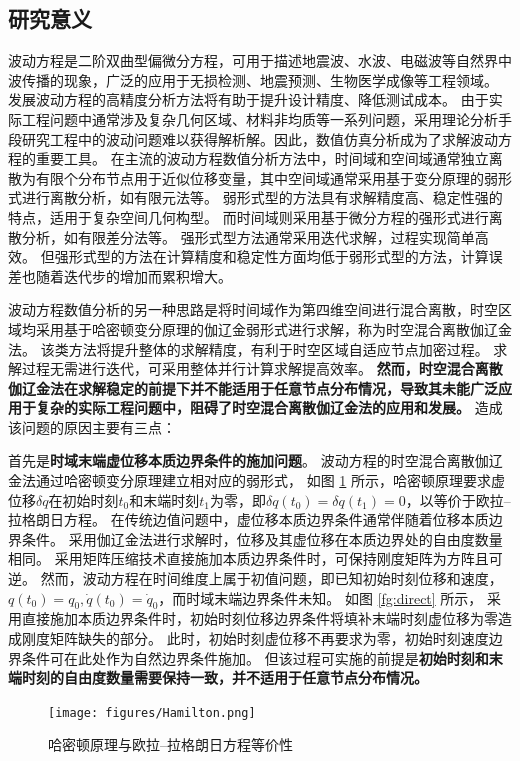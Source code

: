 
\subsection{研究意义}
波动方程是二阶双曲型偏微分方程\cite{bedford1994}，可用于描述地震波、水波、电磁波等自然界中波传播的现象，广泛的应用于无损检测、地震预测、生物医学成像等工程领域。
发展波动方程的高精度分析方法将有助于提升设计精度、降低测试成本。
由于实际工程问题中通常涉及复杂几何区域、材料非均质等一系列问题，采用理论分析手段研究工程中的波动问题难以获得解析解。因此，数值仿真分析成为了求解波动方程的重要工具。
在主流的波动方程数值分析方法中\cite{hughes2000}，时间域和空间域通常独立离散为有限个分布节点用于近似位移变量，其中空间域通常采用基于变分原理的弱形式进行离散分析，如有限元法等。
弱形式型的方法具有求解精度高、稳定性强的特点，适用于复杂空间几何构型。
而时间域则采用基于微分方程的强形式进行离散分析，如有限差分法等。
强形式型方法通常采用迭代求解，过程实现简单高效。
但强形式型的方法在计算精度和稳定性方面均低于弱形式型的方法，计算误差也随着迭代步的增加而累积增大。

波动方程数值分析的另一种思路是将时间域作为第四维空间进行混合离散，时空区域均采用基于哈密顿变分原理的伽辽金弱形式进行求解，称为时空混合离散伽辽金法。
该类方法将提升整体的求解精度，有利于时空区域自适应节点加密过程。
求解过程无需进行迭代，可采用整体并行计算求解提高效率。
\textbf{
然而，时空混合离散伽辽金法在求解稳定的前提下并不能适用于任意节点分布情况，导致其未能广泛应用于复杂的实际工程问题中，阻碍了时空混合离散伽辽金法的应用和发展。
}
造成该问题的原因主要有三点：

首先是\textbf{时域末端虚位移本质边界条件的施加问题}。
波动方程的时空混合离散伽辽金法通过哈密顿变分原理建立相对应的弱形式，
如图 \ref{fg:hamilton} 所示，哈密顿原理要求虚位移$\delta q$在初始时刻$t_0$和末端时刻$t_1$为零，即$\delta q(t_0)=\delta q(t_1)=0$，以等价于欧拉--拉格朗日方程\cite{arnold1978}。
在传统边值问题中，虚位移本质边界条件通常伴随着位移本质边界条件。
采用伽辽金法进行求解时，位移及其虚位移在本质边界处的自由度数量相同。
采用矩阵压缩技术直接施加本质边界条件时，可保持刚度矩阵为方阵且可逆。
然而，波动方程在时间维度上属于初值问题，即已知初始时刻位移和速度，$q(t_0)=q_0,\dot q(t_0) = \dot q_0$，而时域末端边界条件未知。
如图 \ref{fg:direct} 所示，
采用直接施加本质边界条件时，初始时刻位移边界条件将填补末端时刻虚位移为零造成刚度矩阵缺失的部分。
此时，初始时刻虚位移不再要求为零，初始时刻速度边界条件可在此处作为自然边界条件施加。
但该过程可实施的前提是\textbf{初始时刻和末端时刻的自由度数量需要保持一致，并不适用于任意节点分布情况。}

\begin{figure}[!h]
    \centering 
    \texttt{[image: figures/Hamilton.png]}
    \caption{哈密顿原理与欧拉--拉格朗日方程等价性}
    \label{fg:hamilton}
\end{figure}

